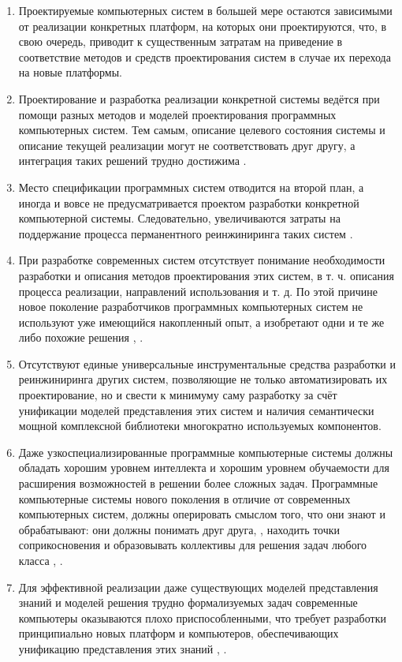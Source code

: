 \begin{enumerate}
   \item Проектируемые компьютерных систем в большей мере остаются зависимыми от реализации конкретных платформ, на которых они проектируются, что, в свою очередь, приводит к существенным затратам на приведение в соответствие методов и средств проектирования систем в случае их перехода на новые платформы.
   \item Проектирование и разработка реализации конкретной системы ведётся при помощи разных методов и моделей проектирования программных компьютерных систем. Тем самым, описание целевого состояния системы и описание текущей реализации могут не соответствовать друг другу, а интеграция таких решений трудно достижима .
   \item Место спецификации программных систем отводится на второй план, а иногда и вовсе не предусматривается проектом разработки конкретной компьютерной системы. Следовательно, увеличиваются затраты на поддержание процесса перманентного реинжиниринга таких систем .
   \item При разработке современных систем отсутствует понимание необходимости разработки и описания методов проектирования этих систем, в т. ч. описания процесса реализации, направлений использования и т. д. По этой причине новое поколение разработчиков программных компьютерных систем не используют уже имеющийся накопленный опыт, а изобретают одни и те же либо похожие решения , .
   \item Отсутствуют единые универсальные инструментальные средства разработки \cite{kabilan2007ontology} и реинжиниринга других систем, позволяющие не только автоматизировать их проектирование, но и свести к минимуму саму разработку за счёт унификации моделей представления этих систем и наличия семантически мощной комплексной библиотеки многократно используемых компонентов.
   \item Даже узкоспециализированные программные компьютерные системы должны обладать хорошим уровнем интеллекта и хорошим уровнем обучаемости для расширения возможностей в решении более сложных задач. Программные компьютерные системы нового поколения в отличие от современных компьютерных систем, должны оперировать смыслом того, что они знают и обрабатывают: они должны понимать друг друга, \cite{ouksel1999semantic}, \cite{neiva2016towards} находить точки соприкосновения и образовывать коллективы для решения задач любого класса , \cite{zhou2022cognitive}.
   \item Для эффективной реализации даже существующих моделей представления знаний и моделей решения трудно формализуемых задач современные компьютеры оказываются плохо приспособленными, что требует разработки принципиально новых платформ и компьютеров, обеспечивающих унификацию представления этих знаний \cite{hagoort2009semantic}, \cite{siekmann1984universal}.
\end{enumerate}

